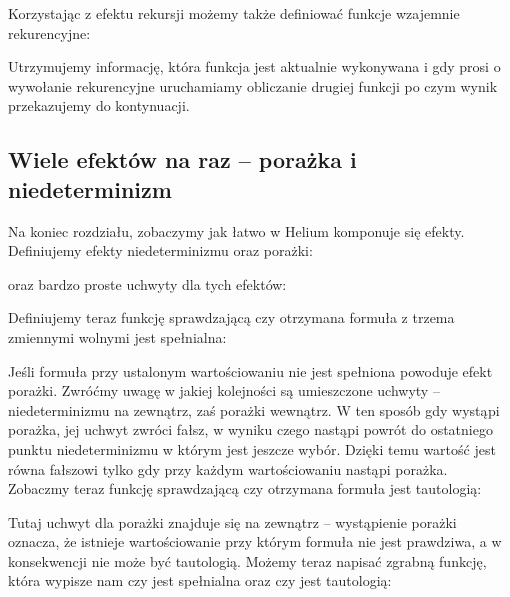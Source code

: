 Korzystając z efektu rekursji możemy także definiować funkcje wzajemnie rekurencyjne:



Utrzymujemy informację, która funkcja jest aktualnie wykonywana i gdy prosi o wywołanie rekurencyjne uruchamiamy obliczanie drugiej funkcji po czym wynik przekazujemy do kontynuacji.

% 
% 

\subsection{Wiele efektów na raz -- porażka i niedeterminizm}

Na koniec rozdziału, zobaczymy jak łatwo w Helium komponuje się efekty. Definiujemy efekty niedeterminizmu oraz porażki:



oraz bardzo proste uchwyty dla tych efektów:



Definiujemy teraz funkcję sprawdzającą czy otrzymana formuła z trzema zmiennymi wolnymi jest spełnialna:



Jeśli formuła przy ustalonym wartościowaniu nie jest spełniona powoduje efekt porażki. Zwróćmy uwagę w jakiej kolejności są umieszczone uchwyty -- niedeterminizmu na zewnątrz, zaś porażki wewnątrz. W ten sposób gdy wystąpi porażka, jej uchwyt zwróci fałsz, w wyniku czego nastąpi powrót do ostatniego punktu niedeterminizmu w którym jest jeszcze wybór. Dzięki temu wartość  jest równa fałszowi tylko gdy przy każdym wartościowaniu nastąpi porażka. Zobaczmy teraz funkcję sprawdzającą czy otrzymana formuła jest tautologią:



Tutaj uchwyt dla porażki znajduje się na zewnątrz -- wystąpienie porażki oznacza, że istnieje wartościowanie przy którym formuła nie jest prawdziwa, a w konsekwencji nie może być tautologią. Możemy teraz napisać zgrabną funkcję, która wypisze nam czy  jest spełnialna oraz czy jest tautologią:

